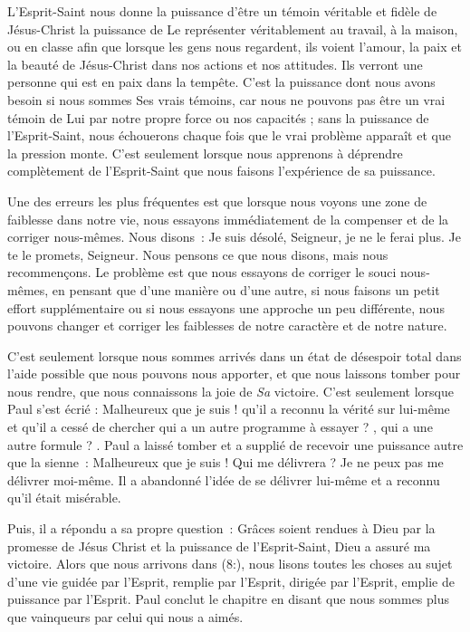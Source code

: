 L'Esprit-Saint nous donne la puissance d'être un témoin véritable
 et fidèle de Jésus-Christ \ocadr la puissance de Le représenter
 véritablement au travail, à la maison, ou en classe \fcadr{}
 afin que lorsque les gens nous regardent, ils voient l'amour,
 la paix et la beauté de Jésus-Christ dans nos actions et nos attitudes.
 Ils verront une personne qui est en paix dans la tempête.
 C'est la puissance dont nous avons besoin si nous sommes Ses vrais témoins,
 car nous ne pouvons pas être un vrai témoin de Lui par notre propre force
 ou nos capacités ; sans la puissance de l'Esprit-Saint, nous échouerons
 chaque fois que le vrai problème apparaît et que la pression monte.
 C'est seulement lorsque nous apprenons à déprendre complètement
 de l'Esprit-Saint que nous faisons l'expérience de sa puissance.

Une des erreurs les plus fréquentes est que lorsque nous voyons une zone
 de faiblesse dans notre vie, nous essayons immédiatement de la compenser
 et de la corriger nous-mêmes. Nous disons~:
 \og Je suis désolé, Seigneur, je ne le ferai plus.
 Je te le promets, Seigneur. \fg{}
 Nous pensons ce que nous disons, mais nous recommençons.
 Le problème est que nous essayons de corriger le souci nous-mêmes,
 en pensant que d'une manière ou d'une autre, si nous faisons un petit effort
 supplémentaire ou si nous essayons une approche un peu différente,
 nous pouvons changer et corriger les faiblesses de notre caractère
 et de notre nature.

C'est seulement lorsque nous sommes arrivés dans un état de désespoir total
 dans l'aide possible que nous pouvons nous apporter, et que nous laissons
 tomber pour nous rendre, que nous connaissons la joie de \emph{Sa} victoire.
 C'est seulement lorsque Paul s'est écrié :
 \og Malheureux que je suis ! \fg{} qu'il a reconnu la vérité sur lui-même
 et qu'il a cessé de chercher \og qui a un autre programme à essayer ? \fg{},
 \og qui a une autre formule ? \fg{}.
 Paul a laissé tomber et a supplié de recevoir une puissance
 autre que la sienne~: \og Malheureux que je suis ! Qui me délivrera ?
 Je ne peux pas me délivrer moi-même. \fg{}
 Il a abandonné l'idée de se délivrer lui-même et a reconnu
 qu'il était misérable.

Puis, il a répondu a sa propre question~:
 \og Grâces soient rendues à Dieu par la promesse de Jésus Christ
 et la puissance de l'Esprit-Saint, Dieu a assuré ma victoire. \fg{}
 Alors que nous arrivons dans (8:),
 nous lisons toutes les choses au sujet d'une vie guidée par l'Esprit,
 remplie par l'Esprit, dirigée par l'Esprit, emplie de puissance par l'Esprit.
 Paul conclut le chapitre en disant que nous sommes \og plus que vainqueurs
 par celui qui nous a aimés. \fg{}

